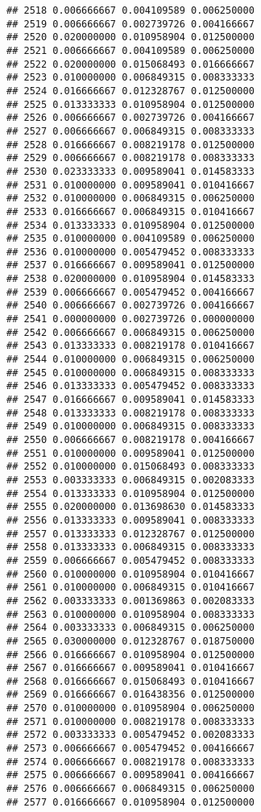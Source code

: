 \documentclass[
]{article}
\begin{document}
\begin{verbatim}
## 2518 0.006666667 0.004109589 0.006250000
## 2519 0.006666667 0.002739726 0.004166667
## 2520 0.020000000 0.010958904 0.012500000
## 2521 0.006666667 0.004109589 0.006250000
## 2522 0.020000000 0.015068493 0.016666667
## 2523 0.010000000 0.006849315 0.008333333
## 2524 0.016666667 0.012328767 0.012500000
## 2525 0.013333333 0.010958904 0.012500000
## 2526 0.006666667 0.002739726 0.004166667
## 2527 0.006666667 0.006849315 0.008333333
## 2528 0.016666667 0.008219178 0.012500000
## 2529 0.006666667 0.008219178 0.008333333
## 2530 0.023333333 0.009589041 0.014583333
## 2531 0.010000000 0.009589041 0.010416667
## 2532 0.010000000 0.006849315 0.006250000
## 2533 0.016666667 0.006849315 0.010416667
## 2534 0.013333333 0.010958904 0.012500000
## 2535 0.010000000 0.004109589 0.006250000
## 2536 0.010000000 0.005479452 0.008333333
## 2537 0.016666667 0.009589041 0.012500000
## 2538 0.020000000 0.010958904 0.014583333
## 2539 0.006666667 0.005479452 0.004166667
## 2540 0.006666667 0.002739726 0.004166667
## 2541 0.000000000 0.002739726 0.000000000
## 2542 0.006666667 0.006849315 0.006250000
## 2543 0.013333333 0.008219178 0.010416667
## 2544 0.010000000 0.006849315 0.006250000
## 2545 0.010000000 0.006849315 0.008333333
## 2546 0.013333333 0.005479452 0.008333333
## 2547 0.016666667 0.009589041 0.014583333
## 2548 0.013333333 0.008219178 0.008333333
## 2549 0.010000000 0.006849315 0.008333333
## 2550 0.006666667 0.008219178 0.004166667
## 2551 0.010000000 0.009589041 0.012500000
## 2552 0.010000000 0.015068493 0.008333333
## 2553 0.003333333 0.006849315 0.002083333
## 2554 0.013333333 0.010958904 0.012500000
## 2555 0.020000000 0.013698630 0.014583333
## 2556 0.013333333 0.009589041 0.008333333
## 2557 0.013333333 0.012328767 0.012500000
## 2558 0.013333333 0.006849315 0.008333333
## 2559 0.006666667 0.005479452 0.008333333
## 2560 0.010000000 0.010958904 0.010416667
## 2561 0.010000000 0.006849315 0.010416667
## 2562 0.003333333 0.001369863 0.002083333
## 2563 0.010000000 0.010958904 0.008333333
## 2564 0.003333333 0.006849315 0.006250000
## 2565 0.030000000 0.012328767 0.018750000
## 2566 0.016666667 0.010958904 0.012500000
## 2567 0.016666667 0.009589041 0.010416667
## 2568 0.016666667 0.015068493 0.010416667
## 2569 0.016666667 0.016438356 0.012500000
## 2570 0.010000000 0.010958904 0.006250000
## 2571 0.010000000 0.008219178 0.008333333
## 2572 0.003333333 0.005479452 0.002083333
## 2573 0.006666667 0.005479452 0.004166667
## 2574 0.006666667 0.008219178 0.008333333
## 2575 0.006666667 0.009589041 0.004166667
## 2576 0.006666667 0.006849315 0.006250000
## 2577 0.016666667 0.010958904 0.012500000

\end{verbatim}
\end{document}

